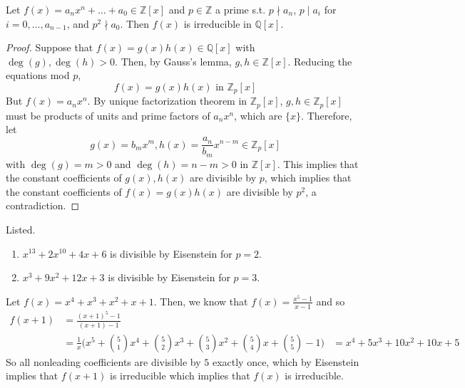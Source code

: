   \begin{theorem}
    Let $f(x) = a_n x^n + \ldots + a_0 \in \mathbb{Z}[x]$ and $p \in \mathbb{Z}$ a prime s.t. $p \nmid a_n$, $p \mid a_i$ for $i = 0, \ldots, a_{n-1}$, and $p^2 \nmid a_0$. Then $f(x)$ is irreducible in $\mathbb{Q}[x]$. 
  \end{theorem}
  \begin{proof}
    Suppose that $f(x) = g(x) h(x) \in \mathbb{Q}[x]$ with $\deg(g), \deg(h) > 0$. Then, by Gauss's lemma, $g, h \in \mathbb{Z}[x]$. Reducing the equations mod $p$, 
    \begin{equation}
      f(x) = g(x) h(x) \text{ in } \mathbb{Z}_p [x]
    \end{equation}
    But $f(x) = a_n x^n$. By unique factorization theorem in $\mathbb{Z}_p [x]$, $g, h \in \mathbb{Z}_p [x]$ must be products of units and prime factors of $a_n x^n$, which are $\{x\}$. Therefore, let 
    \begin{equation}
      g(x) = b_m x^m, h(x) = \frac{a_n}{b_m} x^{n-m} \in \mathbb{Z}_p [x]
    \end{equation}
    with $\deg(g) = m > 0$ and $\deg(h) = n - m > 0$ in $\mathbb{Z}[x]$. This implies that the constant coefficients of $g(x), h(x)$ are divisible by $p$, which implies that the constant coefficients of $f(x) = g(x) h(x)$ are divisible by $p^2$, a contradiction. 
  \end{proof}

  \begin{example}
    Listed. 
    \begin{enumerate}
      \item $x^{13} + 2x^{10} + 4x + 6$ is divisible by Eisenstein for $p = 2$. 
      \item $x^3 + 9x^2 + 12x + 3$ is divisible by Eisenstein for $p = 3$. 
    \end{enumerate}
  \end{example}

  \begin{example}
    Let $f(x) = x^4 + x^3 + x^2 + x + 1$. Then, we know that $f(x) = \frac{x^5 - 1}{x-1}$ and so 
    \begin{align}
      f(x + 1) & = \frac{(x + 1)^5 - 1}{(x + 1) - 1} \\
               & = \frac{1}{x} \bigg( x^5 + \binom{5}{1} x^4 + \binom{5}{2} x^3 + \binom{5}{3} x^2 + \binom{5}{4} x + \binom{5}{5} - 1 \bigg) 
               & = x^4 + 5x^3 + 10 x^2 + 10x + 5
    \end{align}
    So all nonleading coefficients are divisible by $5$ exactly once, which by Eisenstein implies that $f(x+1)$ is irreducible which implies that $f(x)$ is irreducible. 
  \end{example}

